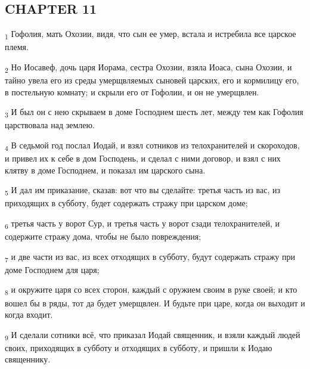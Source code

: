 \subsection{CHAPTER 11}
\begin{tcolorbox}
\textsubscript{1} Гофолия, мать Охозии, видя, что сын ее умер, встала и истребила все царское племя.
\end{tcolorbox}
\begin{tcolorbox}
\textsubscript{2} Но Иосавеф, дочь царя Иорама, сестра Охозии, взяла Иоаса, сына Охозии, и тайно увела его из среды умерщвляемых сыновей царских, его и кормилицу его, в постельную комнату; и скрыли его от Гофолии, и он не умерщвлен.
\end{tcolorbox}
\begin{tcolorbox}
\textsubscript{3} И был он с нею скрываем в доме Господнем шесть лет, между тем как Гофолия царствовала над землею.
\end{tcolorbox}
\begin{tcolorbox}
\textsubscript{4} В седьмой год послал Иодай, и взял сотников из телохранителей и скороходов, и привел их к себе в дом Господень, и сделал с ними договор, и взял с них клятву в доме Господнем, и показал им царского сына.
\end{tcolorbox}
\begin{tcolorbox}
\textsubscript{5} И дал им приказание, сказав: вот что вы сделайте: третья часть из вас, из приходящих в субботу, будет содержать стражу при царском доме;
\end{tcolorbox}
\begin{tcolorbox}
\textsubscript{6} третья часть у ворот Сур, и третья часть у ворот сзади телохранителей, и содержите стражу дома, чтобы не было повреждения;
\end{tcolorbox}
\begin{tcolorbox}
\textsubscript{7} и две части из вас, из всех отходящих в субботу, будут содержать стражу при доме Господнем для царя;
\end{tcolorbox}
\begin{tcolorbox}
\textsubscript{8} и окружите царя со всех сторон, каждый с оружием своим в руке своей; и кто вошел бы в ряды, тот да будет умерщвлен. И будьте при царе, когда он выходит и когда входит.
\end{tcolorbox}
\begin{tcolorbox}
\textsubscript{9} И сделали сотники всё, что приказал Иодай священник, и взяли каждый людей своих, приходящих в субботу и отходящих в субботу, и пришли к Иодаю священнику.
\end{tcolorbox}
